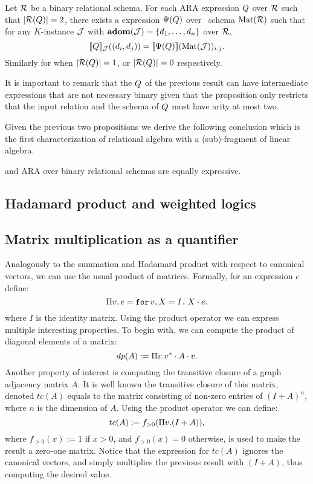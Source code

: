 \begin{proposition}
	Let $\mathcal{R}$ be a binary relational schema. For each ARA expression $Q$ over $\mathcal{R}$  such that $|\mathcal{R}(Q)| = 2$, there exists a \langsum  expression $\Psi(Q)$ over \lang \ schema $\text{Mat}(\mathcal{R})$ such that for any $K$-instance $\mathcal{J}$ with $\mathbf{adom}(\mathcal{J}) = \{d_1, \ldots, d_n\}$ over $\mathcal{R}$,
	$$
	\llbracket Q \rrbracket_{\mathcal{J}}((d_i, d_j))=\llbracket \Psi(Q) \rrbracket(\text{Mat}(\mathcal{J}))_{i,j}.
	$$
	Similarly for when $|\mathcal{R}(Q)| = 1$, or $|\mathcal{R}(Q)| = 0$ respectively.
\end{proposition} 

It is important to remark that the $Q$ of the previous result can have intermediate expressions that are not necessary binary given that the proposition only restricts that the input relation and the schema of $Q$ must have arity at most two. 

Given the previous two propositions we derive the following conclusion which is the first characterization of relational algebra with a (sub)-fragment of linear algebra.
\begin{corollary}
	\langsum and ARA over binary relational schemas are equally expressive. 
\end{corollary}


\subsection{Hadamard product and weighted logics}




\subsection{Matrix multiplication as a quantifier}

Analogously to the summation and Hadamard product with respect to canonical vectors, we can use the usual product of matrices. Formally, for an expression $e$ define:
$$
\Pi v.\,  e=\texttt{for}\, v,X = I \texttt{.}\, X\cdot e.
$$
where $I$ is the identity matrix. 
Using the product operator we can express multiple interesting properties. To begin with, we can compute the product of diagonal elements of a matrix: 
$$
dp(A) := \Pi v. v^*\cdot A \cdot v.$$
Another property of interest is computing the transitive closure of a graph adjacency matrix $A$. It is well known the transitive closure of this matrix, denoted $tc(A)$ equals to the matrix consisting of non-zero entries of $(I + A)^n$, where $n$ is the dimension of $A$. Using the product operator we can define:
$$tc(A) := f_{>0}(\Pi v. (I + A)),$$
where $f_{>0}(x) := 1$ if $x>0$, and $f_{>0}(x) = 0$ otherwise, is used to make the result a zero-one matrix. Notice that the expression for $tc(A)$ ignores the canonical vectors, and simply multiplies the previous result with $(I + A)$, thus computing the desired value.

